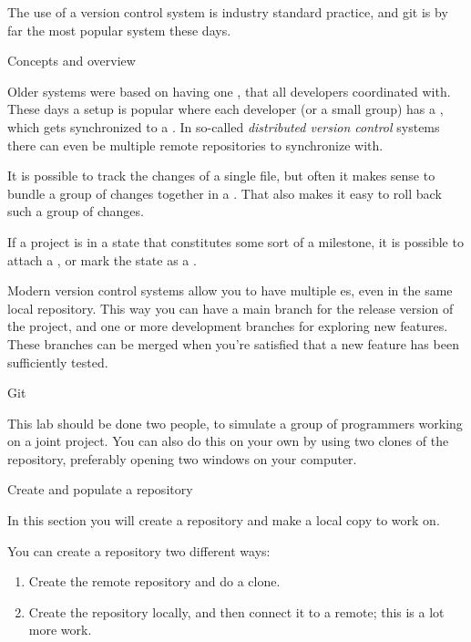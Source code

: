 The use of a version control system is industry standard practice,
and git is by far the most popular system these days.

 {Concepts and overview}

Older systems were based on having one ,
that all developers coordinated with.
These days a setup is popular where each developer (or a small group)
has a ,
which gets synchronized to a .
In so-called \emph{distributed version control}
systems there can even be multiple remote repositories to synchronize with.

It is possible to track the changes of a single file,
but often it makes sense to bundle a group of changes
together in a .
That also makes it easy to roll back such a group of changes.

If a project is in a state that constitutes some sort of a milestone,
it is possible to attach a ,
or mark the state as a .

Modern version control systems allow you to have
multiple es,
even in the same local repository.
This way you can have a main branch for the release version of the project,
and one or more development branches for exploring new features.
These branches can be merged when you're satisfied that a new feature has been
sufficiently tested.

 {Git}
\lstset{style=gitsession}

This lab should be done two people, to simulate a group
of programmers working on a joint project. You can also do this on
your own by using two clones of the repository, 
preferably opening two windows on your computer.


\newpage
{} {Create and populate a repository}

\begin{purpose}
  In this section you will create a repository and make a local copy
  to work on.
\end{purpose}

You can create a repository two different ways:
\begin{enumerate}
\item Create the remote repository and do a clone.
\item Create the repository locally, and then connect it to a remote;
  this is a lot more work.
\end{enumerate}


